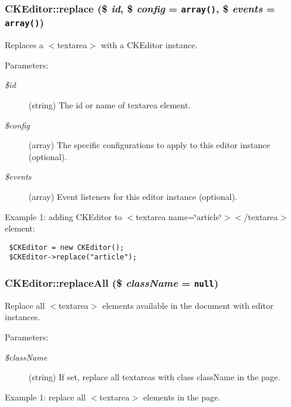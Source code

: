  \hypertarget{classCKEditor_82ebacb89f96be38393ebd53a6a9ab52}{
\subsubsection[{replace}]{\setlength{\rightskip}{0pt plus 5cm}CKEditor::replace (\$ {\em id}, \/  \$ {\em config} = {\tt array()}, \/  \$ {\em events} = {\tt array()})}}
\label{classCKEditor_82ebacb89f96be38393ebd53a6a9ab52}


Replaces a $<$textarea$>$ with a CKEditor instance.

\begin{Desc}
\item[Parameters:]
\begin{description}
\item[{\em \$id}](string) The id or name of textarea element. \item[{\em \$config}](array) The specific configurations to apply to this editor instance (optional). \item[{\em \$events}](array) Event listeners for this editor instance (optional).\end{description}
\end{Desc}
Example 1: adding CKEditor to $<$textarea name=\char`\"{}article\char`\"{}$>$$<$/textarea$>$ element: 

\begin{Code}\begin{verbatim} $CKEditor = new CKEditor();
 $CKEditor->replace("article");
\end{verbatim}
\end{Code}

 \hypertarget{classCKEditor_31836dd682c8d9d6bc5d59063b37c8b8}{
\subsubsection[{replaceAll}]{\setlength{\rightskip}{0pt plus 5cm}CKEditor::replaceAll (\$ {\em className} = {\tt null})}}
\label{classCKEditor_31836dd682c8d9d6bc5d59063b37c8b8}


Replace all $<$textarea$>$ elements available in the document with editor instances.

\begin{Desc}
\item[Parameters:]
\begin{description}
\item[{\em \$className}](string) If set, replace all textareas with class className in the page.\end{description}
\end{Desc}
Example 1: replace all $<$textarea$>$ elements in the page. 

